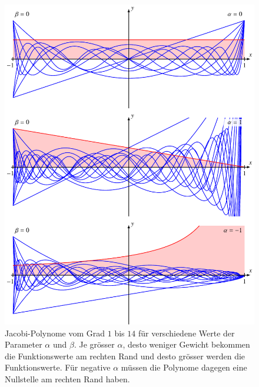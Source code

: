 \begin{figure}
\centering
\includegraphics[width=\textwidth]{chapters/070-orthogonalitaet/images/jacobi.pdf}
\caption{Jacobi-Polynome vom Grad $1$ bis $14$ für verschiedene Werte
der Parameter $\alpha$ und $\beta$.
Je grösser $\alpha$, desto weniger Gewicht bekommen die Funktionswerte am
rechten Rand und desto grösser werden die Funktionswerte.
Für negative $\alpha$ müssen die Polynome dagegen eine Nullstelle am
rechten Rand haben.
\label{buch:orthogonal:fig:jacobi-parameter}}
\end{figure}

%
%

